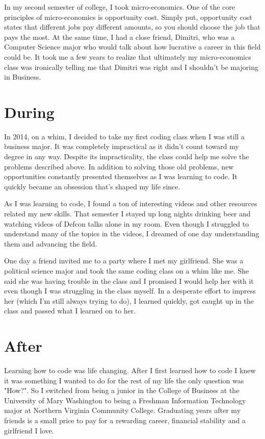 \documentclass[titlepage]{article}
\begin{document}
In my second semester of college, I took micro-economics. One of the core principles of micro-economics is opportunity cost. Simply put, opportunity cost states that different jobs pay different amounts, so you should choose the job that pays the most. At the same time, I had a close friend, Dimitri, who was a Computer Science major who would talk about how lucrative a career in this field could be. It took me a few years to realize that ultimately my micro-economics class was ironically telling me that Dimitri was right and I shouldn't be majoring in Business.


\section{During}

In 2014, on a whim, I decided to take my first coding class when I was still a business major. It was completely impractical as it didn't count toward my degree in any way. Despite its impracticality, the class could help me solve the problems described above. In addition to solving those old problems, new opportunities constantly presented themselves as I was learning to code. It quickly became an obsession that's shaped my life since.

As I was learning to code, I found a ton of interesting videos and other resources related my new skills. That semester I stayed up long nights drinking beer and watching videos of Defcon talks alone in my room. Even though I struggled to understand many of the topics in the videos, I dreamed of one day understanding them and advancing the field.

One day a friend invited me to a party where I met my girlfriend. She was a political science major and took the same coding class on a whim like me. She said she was having trouble in the class and I promised I would help her with it even though I was struggling in the class myself. In a desperate effort to impress her (which I'm still always trying to do), I learned quickly, got caught up in the class and passed what I learned on to her. 

\section{After}

Learning how to code was life changing. After I first learned how to code I knew it was something I wanted to do for the rest of my life the only question was "How?". So I switched from being a junior in the College of Business at the University of Mary Washington to being a Freshman Information Technology major at Northern Virginia Community College. Graduating years after my friends is a small price to pay for a rewarding career, financial stability and a girlfriend I love. 
\end{document}
